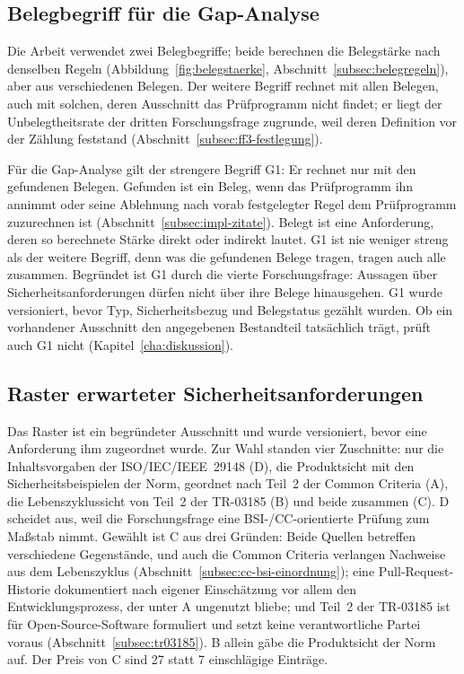 \documentclass[11pt,a4paper]{report}
\begin{document}
\subsection{Belegbegriff für die Gap-Analyse}
\label{subsec:belegbegriff-ff4}

Die Arbeit verwendet zwei Belegbegriffe; beide berechnen die Belegstärke
nach denselben Regeln (Abbildung~\ref{fig:belegstaerke},
Abschnitt~\ref{subsec:belegregeln}), aber aus verschiedenen Belegen. Der
weitere Begriff rechnet mit allen Belegen, auch mit solchen, deren
Ausschnitt das Prüfprogramm nicht findet; er liegt der Unbelegtheitsrate
der dritten Forschungsfrage zugrunde, weil deren Definition vor der
Zählung feststand (Abschnitt~\ref{subsec:ff3-festlegung}).

Für die Gap-Analyse gilt der strengere Begriff G1: Er rechnet nur mit den
gefundenen Belegen. Gefunden ist ein Beleg, wenn das Prüfprogramm ihn
annimmt oder seine Ablehnung nach vorab festgelegter Regel dem
Prüfprogramm zuzurechnen ist (Abschnitt~\ref{subsec:impl-zitate}). Belegt
ist eine Anforderung, deren so berechnete Stärke direkt oder indirekt
lautet. G1 ist nie weniger streng als der weitere Begriff, denn was die
gefundenen Belege tragen, tragen auch alle zusammen. Begründet ist G1 durch
die vierte Forschungsfrage: Aussagen über Sicherheitsanforderungen dürfen
nicht über ihre Belege hinausgehen. G1 wurde versioniert, bevor Typ,
Sicherheitsbezug und Belegstatus gezählt wurden. Ob ein vorhandener
Ausschnitt den angegebenen Bestandteil tatsächlich trägt, prüft auch G1
nicht (Kapitel~\ref{cha:diskussion}).

\subsection{Raster erwarteter Sicherheitsanforderungen}
\label{subsec:sicherheitsraster}

Das Raster ist ein begründeter Ausschnitt und wurde versioniert, bevor
eine Anforderung ihm zugeordnet wurde. Zur Wahl standen vier Zuschnitte:
nur die Inhaltsvorgaben der ISO/IEC/IEEE~29148 (D), die Produktsicht
mit den Sicherheitsbeispielen der Norm, geordnet nach Teil~2 der Common
Criteria (A), die Lebenszyklussicht von Teil~2 der TR-03185 (B) und
beide zusammen (C). D scheidet aus, weil die Forschungsfrage eine
BSI-/CC-orientierte Prüfung zum Maßstab nimmt. Gewählt ist C aus drei
Gründen: Beide Quellen betreffen verschiedene Gegenstände, und auch die
Common Criteria verlangen Nachweise aus dem Lebenszyklus
(Abschnitt~\ref{subsec:cc-bsi-einordnung}); eine Pull-Request-Historie
dokumentiert nach eigener Einschätzung vor allem den
Entwicklungsprozess, der unter A ungenutzt bliebe; und Teil~2 der TR-03185 ist für Open-Source-Software formuliert
und setzt keine verantwortliche Partei voraus
(Abschnitt~\ref{subsec:tr03185}). B allein gäbe die Produktsicht der
Norm auf. Der Preis von C sind 27 statt 7 einschlägige Einträge.
\end{document}
